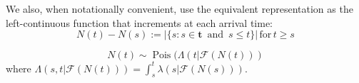 \documentclass[11pt]{article}
\renewcommand{\v}[1]{\boldsymbol{#1}}
\begin{document}
    We also, when notationally convenient, use the equivalent representation
as the left-continuous function that increments at each arrival time: \[
N(t)-N(s):= \left|\{s:s\in \v{t}\,\text{ and }\,s\leq t\}\right| \,\mathrm{ for }\, t\geq s
\]

    \[N(t)\sim \operatorname{Pois}(\Lambda(t|\mathcal{F}(N(t)))\] where
\(\Lambda(s,t|\mathcal{F}(N(t)))=\int_s^t \lambda(s|\mathcal{F}(N(s))).\)



    
    




    
    
\end{document}
